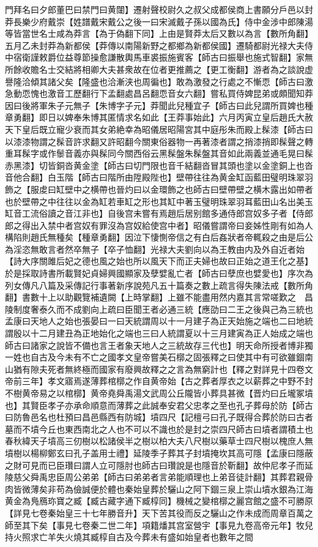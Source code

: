 門拜名曰夕郎董巴曰禁門曰黄闥】遷射聲校尉久之叔父成都侯商上書願分戶邑以封莽長樂少府戴崇【姓譜戴宋戴公之後一曰宋滅戴子孫以國為氏】侍中金涉中郎陳湯等皆當世名士咸為莽言【為于偽翻下同】上由是賢莽太后又數以為言【數所角翻】五月乙未封莽為新都侯【莽傳以南陽新野之都鄉為新都侯國】遷騎都尉光禄大夫侍中宿衛謹敕爵位益尊節操愈謙散輿馬車裘振施賓客【師古曰振舉也施式智翻】家無所餘收贍名士交結將相卿大夫甚衆故在位者更推薦之【更工衡翻】游者為之談說虚譽隆洽傾其諸父矣【隆盛也洽漸浃也周徧也】敢為激發之行處之不慚恧【師古曰激急動恧愧也激音工歷翻行下孟翻處昌呂翻恧音女六翻】嘗私買侍婢昆弟或頗聞知莽因曰後將軍朱子元無子【朱博字子元】莽聞此兒種宜子【師古曰此兒謂所買婢也種章勇翻】即日以婢奉朱博其匿情求名如此【王莽事始此】六月丙寅立皇后趙氏大赦天下皇后既立寵少衰而其女弟絶幸為昭儀居昭陽宮其中庭彤朱而殿上髹漆【師古曰以漆漆物謂之髹音許求翻又許昭翻今關東俗器物一再著漆者謂之捎漆捎即髹聲之轉重耳髹字或作䰍音義亦與髹同今關西俗云黑髹盤朱髹盤其音如此兩義並通毛晃曰髹赤黑漆】切皆銅沓黄金塗【師古曰切門限也音千結翻沓冒其頭也塗以金塗銅上也沓音他合翻】白玉階【師古曰階所由陞殿陛也】壁帶往往為黄金缸函藍田璧明珠翠羽飾之【服䖍曰缸壁中之横帶也晉灼曰以金環飾之也師古曰壁帶壁之横木露出如帶者也於壁帶之中往往以金為缸若車缸之形也其缸中著玉璧明珠翠羽耳藍田山名出美玉缸音工流俗讀之音江非也】自後宫未嘗有焉趙后居别館多通侍郎宫奴多子者【侍郎郎之得出入禁中者宫奴有罪沒為宫奴給使宫中者】昭儀嘗謂帝曰妾姊性剛有如為人構陷則趙氏無種矣【種章勇翻】因泣下悽惻帝信之有白后姦狀者帝輒殺之由是后公為淫恣無敢言者然卒無子【卒子恤翻】光禄大夫劉向以為王教由内及外自近者始【詩大序關雎后妃之德也風之始也所以風天下而正夫婦也故曰正始之道王化之基】於是採取詩書所載賢妃貞婦興國顯家及孽嬖亂亡者【師古曰孽庶也嬖愛也】序次為列女傳凡八篇及采傳記行事著新序說苑凡五十篇奏之數上疏言得失陳法戒【數所角翻】書數十上以助觀覽補遺闕【上時掌翻】上雖不能盡用然内嘉其言常嗟歎之　昌陵制度奢泰久而不成劉向上疏曰臣聞王者必通三統【應劭曰二王之後與己為三統也孟康曰天地人之始也張晏曰一曰天統謂周以十一月建子為正天始施之端也二曰地統謂殷以十二月建丑為正地始化之端也三曰人統謂夏以十三月建寅為正人始成之端也師古曰諸家之說皆不備也言王者象天地人之三統故存三代也】明天命所授者博非獨一姓也自古及今未有不亡之國孝文皇帝嘗美石槨之固張釋之曰使其中有可欲雖錮南山猶有隙夫死者無終極而國家有廢興故釋之之言為無窮計也【釋之對詳見十四卷文帝前三年】孝文寤焉遂薄葬棺槨之作自黄帝始【古之葬者厚衣之以薪葬之中野不封不樹黄帝易之以棺槨】黄帝堯舜禹湯文武周公丘隴皆小葬具甚微【晋灼曰丘壠冢墳也】其賢臣孝子亦承命順意而薄葬之此誠奉安君父忠孝之至也孔子葬母於防【師古曰防魯邑名也杜預曰昌邑縣西有防城】墳四尺【記檀弓曰孔子既得合葬於防曰古者墓而不墳今丘也東西南北之人也不可以不識也於是封之崇四尺師古曰墳者謂積土也春秋緯天子墳高三仞樹以松諸侯半之樹以柏大夫八尺樹以藥草士四尺樹以槐庶人無墳樹以楊柳鄭玄曰孔子盖用士禮】延陵季子葬其子封墳掩坎其高可隱【孟康曰隱蔽之財可見而已臣瓚曰謂人立可隱肘也師古曰瓚說是也隱音於靳翻】故仲尼孝子而延陵慈父舜禹忠臣周公弟弟【師古曰弟弟者言弟能順理也上弟音徒計翻】其葬君親骨肉皆微薄矣非苟為儉誠便於體也秦始皇葬於驪山之阿下錮三泉上崇山墳水銀為江海黄金為鳬鴈珎寶之臧【臧古藏字通下臧椁同】機械之變棺槨之麗宫館之盛不可勝原【詳見七卷秦始皇三十七年勝音升】天下苦其役而反之驪山之作未成而周章百萬之師至其下矣【事見七卷秦二世二年】項籍燔其宫室營宇【事見九卷高帝元年】牧兒持火照求亡羊失火燒其臧椁自古及今葬未有盛如始皇者也數年之間